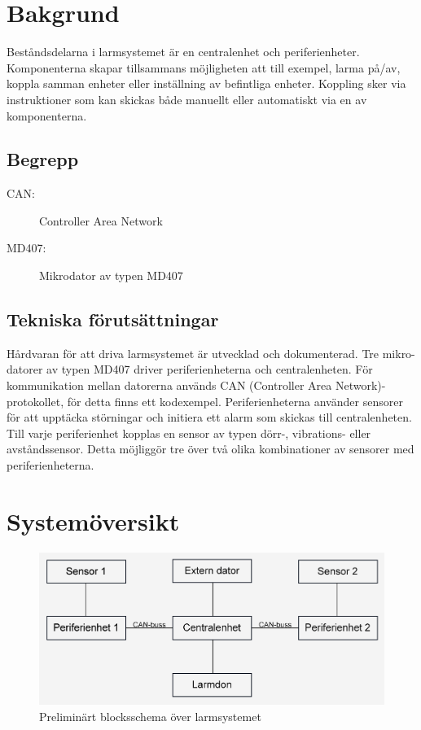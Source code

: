 \documentclass[a4paper]{article}
\begin{document}

\section{Bakgrund}

Beståndsdelarna i larmsystemet är en centralenhet och periferienheter. Komponenterna skapar tillsammans möjligheten att till exempel, larma på/av, koppla samman enheter eller inställning av befintliga enheter. Koppling sker via instruktioner som kan skickas både manuellt eller automatiskt via en av komponenterna.

\subsection{Begrepp}

\begin{description}
    \item[CAN:] Controller Area Network
    \item[MD407:] Mikrodator av typen MD407
\end{description}


\subsection{Tekniska förutsättningar}

Hårdvaran för att driva larmsystemet är utvecklad och dokumenterad. Tre mikro-datorer av typen MD407 driver periferienheterna och centralenheten. För kommunikation mellan datorerna används CAN (Controller Area Network)-protokollet, för detta finns ett kodexempel. Periferienheterna använder sensorer för att upptäcka störningar och initiera ett alarm som skickas till centralenheten. Till varje periferienhet kopplas en sensor av typen dörr-, vibrations- eller avståndssensor. Detta möjliggör tre över två olika kombinationer av sensorer med periferienheterna.

\section{Systemöversikt}

\begin{figure}[H]
    \centering
    \includegraphics[width=\textwidth]{blockschema.png}
    \caption{Preliminärt blocksschema över larmsystemet}
\end{figure}
\end{document}
